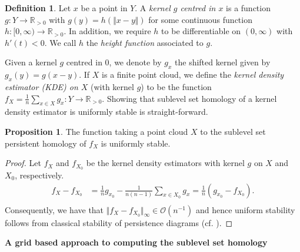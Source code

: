 \documentclass[10pt,a4paper]{article}
\theoremstyle{definition}
\newtheorem{defn}[thm]{Definition}
\newtheorem{prop}{Proposition}[thm]
\newcommand{\posreals}{\ensuremath{\mathbb{R}_{>0}}}
\begin{document}
\begin{defn}
	Let $x$ be a point in $Y$. A \textit{kernel $g$ centred in $x$} is a function $g\colon Y\to\posreals$ with $g(y)=h\left(\Vert x-y\Vert\right)$ for some continuous function $h\colon[0,\infty)\to\posreals$. In addition, we require $h$ to be differentiable on $(0, \infty)$ with $h'(t)<0$. We call $h$ the \textit{height function} associated to $g$.
\end{defn}

Given a kernel $g$ centred in $0$, we denote by $g_x$ the shifted kernel given by $g_x(y)=g(x-y)$. If $X$ is a finite point cloud, we define the \textit{kernel density estimator (KDE) on $X$} (with kernel $g$) to be the function $f_X=\frac{1}{n}\sum_{x\in X}g_x\colon Y\to\posreals$. Showing that sublevel set homology of a kernel density estimator is uniformly stable is straight-forward.

\begin{prop}
	The function taking a point cloud $X$ to the sublevel set persistent homology of $f_X$ is uniformly stable.
\end{prop}
\begin{proof}
	Let $f_X$ and $f_{X_0}$ be the kernel density estimators with kernel $g$ on $X$ and $X_0$, respectively.
	\begin{align*}
		f_X - f_{X_0} &= \frac{1}{n}g_{x_0} -\frac{1}{n(n-1)}\sum_{x\in X_0}g_x
		= \frac{1}{n}\left(g_{x_0} - f_{X_0}\right). \\
	\end{align*}
	Consequently, we have that $\Vert f_X - f_{X_0}\Vert_\infty\in\mathcal{O}(n^{-1})$ and hence uniform stability follows from classical stability of persistence diagrams (cf. \autocite{cohen2005stability}).
\end{proof}

\textbf{A grid based approach to computing the sublevel set homology}
\end{document}
